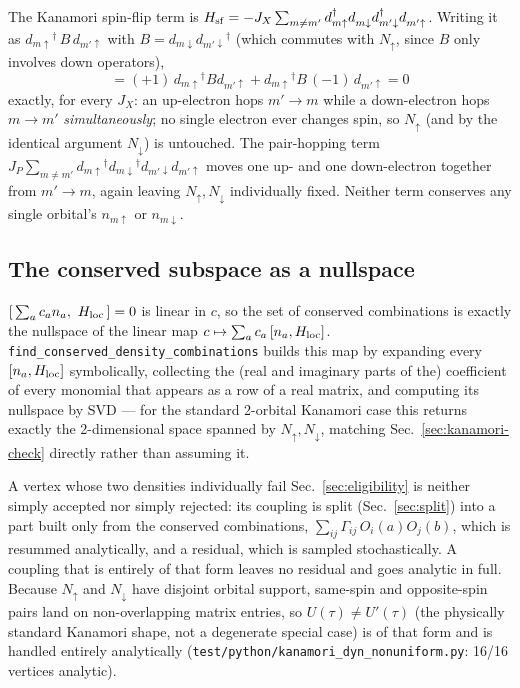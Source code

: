 \documentclass[a4paper,12pt]{article}
\renewcommand{\t}{\ensuremath{\tau}}
\newcommand{\Hloc}{\ensuremath{H_{\rm loc}}}
\newcommand{\ndag}{\ensuremath{^\dagger}}
\begin{document}
The Kanamori spin-flip term is $H_{\rm sf} = -J_X\sum_{m\neq m'} d_{m\uparrow}\ndag
d_{m\downarrow}^{\phantom\dagger} d_{m'\downarrow}\ndag d_{m'\uparrow}^{\phantom\dagger}$.
Writing it as $d_{m\uparrow}\ndag\, B\, d_{m'\uparrow}$ with
$B=d_{m\downarrow}d_{m'\downarrow}\ndag$ (which commutes with $N_\uparrow$, since $B$
only involves down operators),
\begin{equation}
  [N_\uparrow,\, d_{m\uparrow}\ndag B d_{m'\uparrow}]
  = (+1)\,d_{m\uparrow}\ndag B d_{m'\uparrow} + d_{m\uparrow}\ndag B\,(-1)\,d_{m'\uparrow} = 0
\end{equation}
exactly, for every $J_X$: an up-electron hops $m'\!\to\!m$ while a down-electron hops
$m\!\to\!m'$ \emph{simultaneously}; no single electron ever changes spin, so
$N_\uparrow$ (and by the identical argument $N_\downarrow$) is untouched. The
pair-hopping term $J_P\sum_{m\neq m'}d_{m\uparrow}\ndag d_{m\downarrow}\ndag
d_{m'\downarrow}d_{m'\uparrow}$ moves one up- and one down-electron together from
$m'\to m$, again leaving $N_\uparrow,N_\downarrow$ individually fixed. Neither term
conserves any single orbital's $n_{m\uparrow}$ or $n_{m\downarrow}$.

\subsection{The conserved subspace as a nullspace}

$[\,\sum_a c_a n_a,\ \Hloc\,]=0$ is linear in $c$, so the set of conserved
combinations is exactly the nullspace of the linear map $c \mapsto \sum_a c_a\,[n_a,\Hloc]$.
\texttt{find\_conserved\_density\_combinations} builds this map by expanding every
$[n_a,\Hloc]$ symbolically, collecting the (real and imaginary parts of the)
coefficient of every monomial that appears as a row of a real matrix, and computing
its nullspace by SVD --- for the standard 2-orbital Kanamori case this returns
exactly the 2-dimensional space spanned by $N_\uparrow,N_\downarrow$, matching
Sec.~\ref{sec:kanamori-check} directly rather than assuming it.

A vertex whose two densities individually fail Sec.~\ref{sec:eligibility} is neither
simply accepted nor simply rejected: its coupling is split (Sec.~\ref{sec:split}) into a
part built only from the conserved combinations, $\sum_{ij}\Gamma_{ij}\,O_i(a)O_j(b)$,
which is resummed analytically, and a residual, which is sampled stochastically. A
coupling that is entirely of that form leaves no residual and goes analytic in full.
Because $N_\uparrow$ and $N_\downarrow$ have disjoint orbital support, same-spin and
opposite-spin pairs land on non-overlapping matrix entries, so $U(\t)\neq U'(\t)$ (the
physically standard Kanamori shape, not a degenerate special case) is of that form and
is handled entirely analytically
(\texttt{test/python/kanamori\_dyn\_nonuniform.py}: 16/16 vertices analytic).
\end{document}
